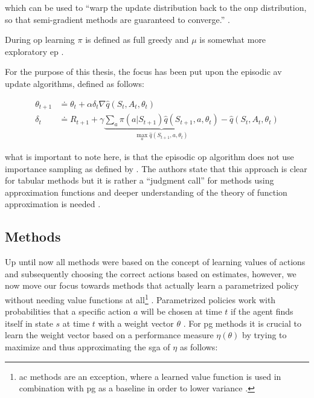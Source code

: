 \documentclass[draft=false]{seal_thesis}
\begin{document}
which can be used to ``warp the update distribution back to the \gls{onp} distribution, so that semi-gradient methods are guaranteed to converge.'' \citep[p. 243]{Sutton2017}.

During \gls{op} learning $\pi$ is defined as full greedy and $\mu$ is somewhat more exploratory \gls{ep} \citep[p. 243]{Sutton2017}.

For the purpose of this thesis, the focus has been put upon the episodic \gls{av} update algorithms, defined as follows:

\begin{align}
	\theta_{t+1} &\doteq \theta_t + \alpha \delta_t \nabla \hat{q} (S_t,A_t,\theta_t)\\
	\delta_t &\doteq R_{t+1} + \gamma \underbrace{\sum_a \pi (a|S_{t+1}) \hat{q} (S_{t+1},a,\theta_t)}_{\max_a \hat{q} (S_{t+1},a,\theta_t)} - \hat{q} (S_t,A_t,\theta_t)
\end{align}

what is important to note here, is that the episodic \gls{op} algorithm does not use importance sampling as defined by  \citep[p. 244]{Sutton2017}. The authors state that this approach is clear for tabular methods but it is rather a ``judgment call'' for methods using approximation functions and deeper understanding of the theory of function approximation is needed \citep[p. 244]{Sutton2017}.

\subsection{ Methods}
\label{subsec:polgrad_methods}

Up until now all methods were based on the concept of learning values of actions and subsequently choosing the correct actions based on estimates, however, we now move our focus towards methods that actually learn a parametrized policy without needing value functions at all\footnote{\gls{ac} methods are an exception, where a learned value function is used in combination with \gls{pg} as a baseline in order to lower variance \citep{Sutton2017}.}  \citep[p. 265]{Sutton2017}. Parametrized policies work with probabilities that a specific action $a$ will be chosen at time $t$ if the agent finds itself in state $s$ at time $t$ with a weight vector $\theta$ \citep[p. 265]{Sutton2017}. For \gls{pg} methods it is crucial to learn the weight vector based on a performance measure $\eta(\theta)$ by trying to maximize and thus approximating the \gls{sga} of $\eta$ as follows:
\end{document}

